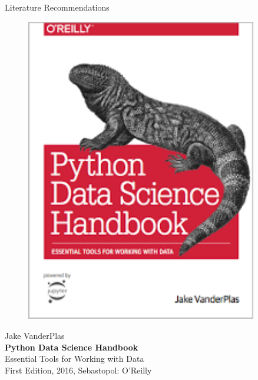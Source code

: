 \documentclass[document.tex]{subfiles}
\begin{document}
\begin{frame}{Literature Recommendations}
\begin{minipage}{0.1\textwidth}
\begin{figure}[H]
                \includegraphics[height=0.2\textheight, width=0.9\textwidth, left]{assets/book-covers/vanderplas2016.png}
            \end{figure}
        \end{minipage}
        \begin{minipage}{0.39\textwidth}
            \footnotesize Jake VanderPlas \normalsize \\[-0.5mm]
            \small \textbf{Python Data Science Handbook} \\[-0.8mm]
            Essential Tools for Working with Data \normalsize \\
            \tiny First Edition, 2016, Sebastopol: O'Reilly \normalsize
        \end{minipage}
        

\end{frame}
\end{document}

